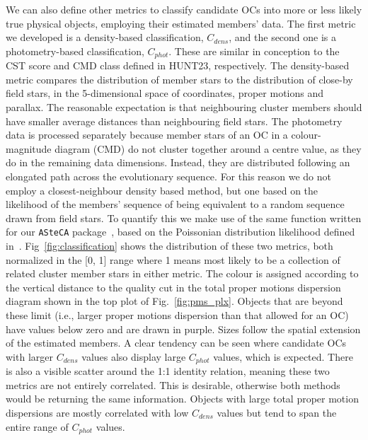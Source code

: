 \documentclass[fleqn,usenatbib]{mnras}
\begin{document}
We can also define other metrics to classify candidate OCs into more or less
likely true physical objects, employing their estimated members' data. The first
metric we developed is a density-based classification, $C_{dens}$, and the
second one is a photometry-based classification, $C_{phot}$.
These are similar in conception to the CST score and CMD class defined in
HUNT23, respectively.
The density-based metric compares the distribution of member stars to the
distribution of close-by field stars, in the 5-dimensional space of coordinates,
proper motions and parallax. The reasonable expectation is that neighbouring
cluster members should have smaller average distances than neighbouring field
stars.
The photometry data is processed separately because member stars of an OC in a
colour-magnitude diagram (CMD) do not cluster together around a centre value, as
they do in the remaining data dimensions. Instead, they are distributed
following an elongated path across the evolutionary sequence. For this reason we
do not employ a closest-neighbour density based method, but one based on the
likelihood of the members' sequence of being equivalent to a random sequence
drawn from field stars. To quantify this we make use of the same function
written for our \texttt{ASteCA} package~\citep{Perren_2015}, based on the
Poissonian distribution likelihood defined in~\cite{Tremmel_2013}.
Fig~\ref{fig:classification} shows the distribution of these two metrics, both
normalized in the [0, 1] range where 1 means most likely to be a collection
of related cluster member stars in either metric. The colour is assigned
according to the vertical distance to the quality cut in the total proper
motions dispersion diagram shown in the top plot of Fig.~\ref{fig:pms_plx}.
Objects that are beyond these limit (i.e., larger proper motions
dispersion than that allowed for an OC) have values below zero and are drawn
in purple. Sizes follow the spatial extension of the estimated members.
A clear tendency can be seen where candidate OCs with larger $C_{dens}$ values
also display large $C_{phot}$ values, which is expected. There is also a visible
scatter around the 1:1 identity relation, meaning these two metrics are not
entirely correlated. This is desirable, otherwise both methods would be
returning the same information. Objects with large total proper motion
dispersions are mostly correlated with low $C_{dens}$ values but tend to span
the entire range of $C_{phot}$ values.
\end{document}
